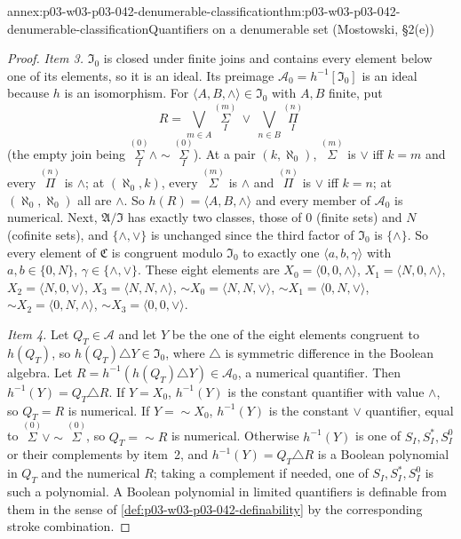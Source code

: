 \begin{annexitem}{annex:p03-w03-p03-042-denumerable-classification}{thm:p03-w03-p03-042-denumerable-classification}{Quantifiers on a denumerable set (Mostowski, \S2(e))}
\begin{proof}
\emph{Item 3.}  \(\mathfrak I_0\) is closed under finite joins and contains
every element below one of its elements, so it is an ideal.  Its preimage
\(\mathcal A_0=h^{-1}[\mathfrak I_0]\) is an ideal because \(h\) is an
isomorphism.  For \(\langle A,B,\wedge\rangle\in\mathfrak I_0\) with \(A,B\)
finite, put
\[
 R=\bigvee_{m\in A}\overset{(m)}{\underset I\Sigma}\ \vee\
   \bigvee_{n\in B}\overset{(n)}{\underset I\Pi}
\]
(the empty join being \(\overset{(0)}{\underset I\Sigma}\wedge
{\sim}\overset{(0)}{\underset I\Sigma}\)).  At a pair \((k,\aleph_0)\),
\(\overset{(m)}{\Sigma}\) is \(\vee\) iff \(k=m\) and every
\(\overset{(n)}{\Pi}\) is \(\wedge\); at \((\aleph_0,k)\), every
\(\overset{(m)}{\Sigma}\) is \(\wedge\) and \(\overset{(n)}{\Pi}\) is \(\vee\)
iff \(k=n\); at \((\aleph_0,\aleph_0)\) all are \(\wedge\).  So
\(h(R)=\langle A,B,\wedge\rangle\) and every member of \(\mathcal A_0\) is
numerical.  Next, \(\mathfrak A/\mathfrak I\) has exactly two classes,
those of \(0\) (finite sets) and \(N\) (cofinite sets), and \(\{\wedge,
\vee\}\) is unchanged since the third factor of \(\mathfrak I_0\) is
\(\{\wedge\}\).  So every element of \(\mathfrak C\) is congruent modulo
\(\mathfrak I_0\) to exactly one \(\langle a,b,\gamma\rangle\) with
\(a,b\in\{0,N\}\), \(\gamma\in\{\wedge,\vee\}\).  These eight elements are
\(X_0=\langle0,0,\wedge\rangle\), \(X_1=\langle N,0,\wedge\rangle\),
\(X_2=\langle N,0,\vee\rangle\), \(X_3=\langle N,N,\wedge\rangle\),
\({\sim}X_0=\langle N,N,\vee\rangle\), \({\sim}X_1=\langle0,N,\vee\rangle\),
\({\sim}X_2=\langle0,N,\wedge\rangle\), \({\sim}X_3=\langle0,0,\vee\rangle\).

\emph{Item 4.}  Let \(Q_T\in\mathcal A\) and let \(Y\) be the one of the
eight elements congruent to \(h(Q_T)\), so \(h(Q_T)\triangle Y\in
\mathfrak I_0\), where \(\triangle\) is symmetric difference in the
Boolean algebra.  Let \(R=h^{-1}(h(Q_T)\triangle Y)\in\mathcal A_0\), a
numerical quantifier.  Then \(h^{-1}(Y)=Q_T\triangle R\).  If \(Y=X_0\),
\(h^{-1}(Y)\) is the constant quantifier with value \(\wedge\), so
\(Q_T=R\) is numerical.  If \(Y={\sim}X_0\), \(h^{-1}(Y)\) is the constant
\(\vee\) quantifier, equal to \(\overset{(0)}\Sigma\vee{\sim}
\overset{(0)}\Sigma\), so \(Q_T={\sim}R\) is numerical.  Otherwise
\(h^{-1}(Y)\) is one of \(S_I,S^{*}_I,S^0_I\) or their complements by
item~2, and \(h^{-1}(Y)=Q_T\triangle R\) is a Boolean polynomial in \(Q_T\)
and the numerical \(R\); taking a complement if needed, one of
\(S_I,S^{*}_I,S^0_I\) is such a polynomial.  A Boolean polynomial in
limited quantifiers is definable from them in the sense of
\cref{def:p03-w03-p03-042-definability} by the corresponding stroke
combination.
\end{proof}
\end{annexitem}

